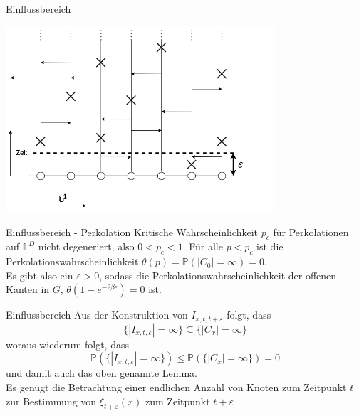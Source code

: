\documentclass[11pt]{beamer}
\begin{document}
\begin{frame}{Einflussbereich}
    \begin{center}
        \includegraphics[width=0.75\textwidth]{images/contact process epsilon.png}
    \end{center}
\end{frame}

\begin{frame}{Einflussbereich - Perkolation}
    Kritische Wahrscheinlichkeit $p_c$ für Perkolationen
    auf $\mathbb{L}^D$ nicht degeneriert, also $0 < p_c < 1$.
    Für alle $p < p_c$ ist die Perkolationswahrscheinlichkeit
    $\theta(p) = \mathbb{P}(|C_0| = \infty) = 0$.
    \vspace{1cm}
    \\
    Es gibt also ein $\varepsilon > 0$, sodass die Perkolationswahrscheinlichkeit der
    offenen Kanten in $G$, $\theta(1 - e^{-2\beta\epsilon}) = 0$ ist.
\end{frame}

\begin{frame}{Einflussbereich}
    Aus der Konstruktion von $I_{x, t, t + \varepsilon}$ folgt, dass
    \begin{equation*}
        \{ |I_{x, t, \varepsilon}| = \infty \} \subseteq \{ |C_x| = \infty \}   
    \end{equation*}
    woraus wiederum folgt, dass
    \begin{equation*}
        \mathbb{P}(\{ |I_{x, t, \varepsilon}| = \infty \}) \leq \mathbb{P}(\{ |C_x| = \infty \}) = 0
    \end{equation*}
    und damit auch das oben genannte Lemma.
    \\
    Es genügt die Betrachtung einer endlichen Anzahl von Knoten zum Zeitpunkt $t$ zur Bestimmung
    von $\xi_{t + \varepsilon}(x)$ zum Zeitpunkt $t + \varepsilon$
\end{frame}
\end{document}
